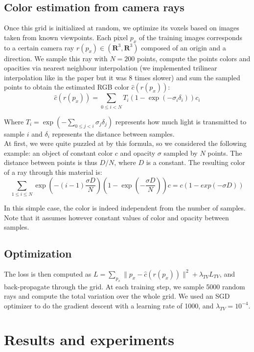 \documentclass{article}
\begin{document}
\subsection{Color estimation from camera rays}

Once this grid is initialized at random, we optimize its voxels based on images taken from known viewpoints. Each pixel $p_x$ of the training images corresponds to a certain camera ray $r(p_x) \in (\mathbf{R}^3, \mathbf{R}^3)$ composed of an origin and a direction. We sample this ray with $N=200$ points, compute the points colors and opacities via nearest neighbour interpolation (we implemented trilinear interpolation like in the paper but it was 8 times slower) and sum the sampled points to obtain the estimated RGB color $\hat{c}(r(p_x))$:
\[\hat{c}(r(p_x)) = \sum_{0\leq i<N} T_i (1 - \exp(-\sigma_i \delta_i)) c_i\] 

Where $ T_i = \exp(- \sum_{0\leq j<i} \sigma_j \delta_j)$ represents how much light is transmitted to sample $i$ and $\delta_i$ represents the distance between samples.\\ 

At first, we were quite puzzled at by this formula, so we considered the following example: an object of constant color $c$ and opacity $\sigma$ sampled by $N$ points. The distance between points is thus $D/N$, where $D$ is a constant. The resulting color of a ray through this material is:
\[ \sum_{1 \leq i \leq N} \exp(- (i-1)\frac{ \sigma D}{N})(1 - \exp(-  \frac{ \sigma D}{N}))c = c (1 - exp(- \sigma D))\]

In this simple case, the color is indeed independent from the number of samples. Note that it assumes however constant values of color and opacity between samples.


\subsection{Optimization}
The loss is then computed as $L = \sum_{p_x} \|p_x -\hat{c}(r(p_x)) \|^2 + \lambda_{TV}  L_{TV}$, and back-propagate through the grid. At each training step, we sample 5000 random rays and compute the total variation over the whole grid. We used an SGD optimizer to do the gradient descent with a learning rate of 1000, and $\lambda_{TV} = 10^{-4}$. 

\section{Results and experiments}
\end{document}
